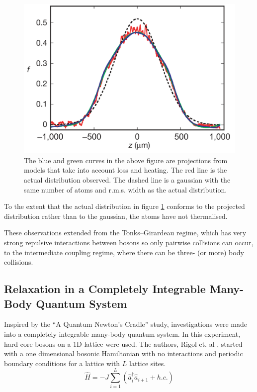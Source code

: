 \documentclass[a4paper, 10pt, draft]{article}
\theoremstyle{plain}
\begin{document}
\begin{figure}[H]
    \begin{center}
    \includegraphics[width=1.0\textwidth]{dephased_momentum_distribution}
    \end{center}
    \caption{\label{dephased_momentum_distribution}
             The blue and green curves in the above figure are projections from
             models that take into account loss and heating. The red line is the
             actual distribution observed. The dashed line is a gaussian with
             the same number of atoms and r.m.s. width as the actual
             distribution.}
 \end{figure}


To the extent that the actual distribution in figure
\ref{dephased_momentum_distribution} conforms to the projected distribution
rather than to the gaussian, the atoms have not thermalised.

These observations extended from the Tonks--Girardeau regime, which has very
strong repulsive interactions between bosons so only pairwise collisions can
occur, to the intermediate coupling regime, where there can be three-
(or more) body collisions.


\subsection{Relaxation in a Completely Integrable Many-Body Quantum System}

Inspired by the ``A Quantum Newton's Cradle'' study, investigations were made
into a completely integrable many-body quantum system. In this experiment,
hard-core bosons on a 1D lattice were used. The authors, Rigol et. al
\cite{Rigol2007}, started with a one dimensional bosonic Hamiltonian with no
interactions and periodic boundary conditions for a lattice with $L$ lattice
sites.
\begin{equation}
 \hat{H}=-J\sum_{i=1}^{L} (\hat{a}_{i}^{\dagger}\hat{a}_{i+1}+h.c.)
\end{equation}
\end{document}
